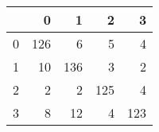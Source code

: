\begin{tabular}{lrrrr}
\toprule
{} &    0 &    1 &    2 &    3 \\
\midrule
0 &  126 &    6 &    5 &    4 \\
1 &   10 &  136 &    3 &    2 \\
2 &    2 &    2 &  125 &    4 \\
3 &    8 &   12 &    4 &  123 \\
\bottomrule
\end{tabular}
